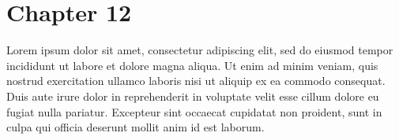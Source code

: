 \chapter{Chapter 12}
\par
Lorem ipsum dolor sit amet, consectetur adipiscing elit, sed do
eiusmod tempor incididunt ut labore et dolore magna aliqua. Ut
enim ad minim veniam, quis nostrud exercitation ullamco laboris
nisi ut aliquip ex ea commodo consequat. Duis aute irure dolor in
reprehenderit in voluptate velit esse cillum dolore eu fugiat
nulla pariatur. Excepteur sint occaecat cupidatat non proident,
sunt in culpa qui officia deserunt mollit anim id est laborum.
